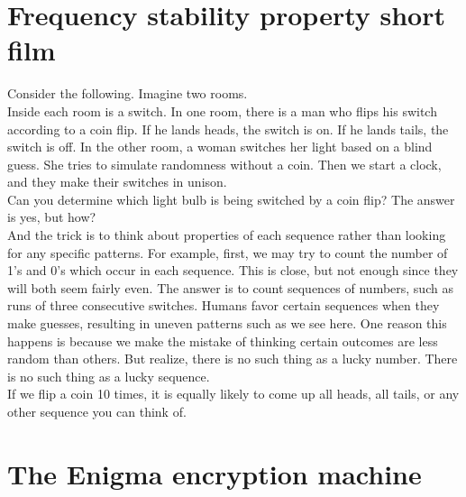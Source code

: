\documentclass{report}
\begin{document}
 \section{Frequency stability property short film}
 Consider the following. Imagine two rooms.\\
 Inside each room is a switch. In one room, there is a man who flips his switch according to a coin flip. If he lands heads, the switch is on. If he lands tails, the switch is off. In the other room, a woman switches her light based on a blind guess. She tries to simulate randomness without a coin. Then we start a clock, and they make their switches in unison. \\
 Can you determine which light bulb is being switched by a coin flip? The answer is yes, but how? \\
 And the trick is to think about properties of each sequence rather than looking for any specific patterns. For example, first, we may try to count the number of 1's and 0's which occur in each sequence. This is close, but not enough since they will both seem fairly even. The answer is to count sequences of numbers, such as runs of three consecutive switches. 
  Humans favor certain sequences when they make guesses, resulting in uneven patterns such as we see here. One reason this happens is because we make the mistake of thinking certain outcomes are less random than others. But realize, there is no such thing as a lucky number. There is no such thing as a lucky sequence. \\
 If we flip a coin 10 times, it is equally likely to come up all heads, all tails, or any other sequence you can think of.
 
 \section{The Enigma encryption machine}
 
\end{document}
